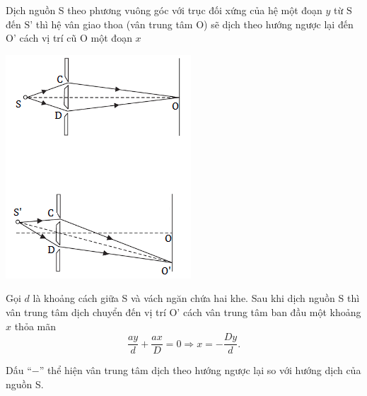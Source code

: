 Dịch nguồn S theo phương vuông góc với trục đối xứng của hệ một đoạn $y$ từ $\text{S}$ đến $\text{S'}$  thì hệ vân giao thoa (vân trung tâm O) sẽ dịch theo hướng ngược lại đến O' cách vị trí cũ O một đoạn $x$
\begin{center}
 	\includegraphics[scale=0.8]{../figs/giaothoa-dichnguon-hung.png}
\end{center}
Gọi $d$ là khoảng cách giữa S và vách ngăn chứa hai khe. Sau khi dịch nguồn S thì vân trung tâm dịch chuyển đến vị trí O' cách vân trung tâm ban đầu một khoảng $x$ thỏa mãn
	\begin{equation}
		\dfrac{ay}{d}+\dfrac{ax}{D}=0 \Rightarrow x=-\dfrac{Dy}{d}.
	\end{equation} 

Dấu ``$-$'' thể hiện vân trung tâm dịch theo hướng ngược lại so với hướng dịch của nguồn S.



